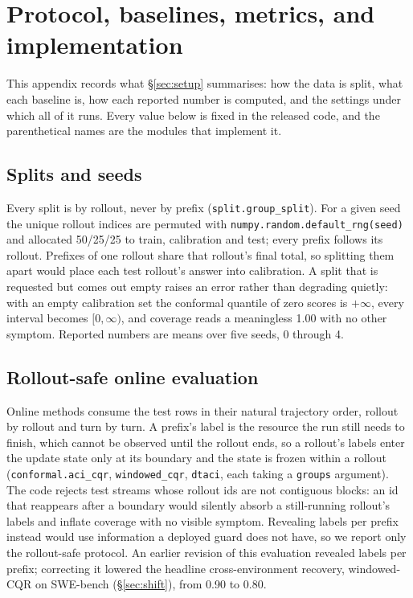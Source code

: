 \documentclass{article}
\begin{document}
\section{Protocol, baselines, metrics, and implementation}
\label{app:protocol}

This appendix records what \S\ref{sec:setup} summarises: how the data is split, what
each baseline is, how each reported number is computed, and the settings under which
all of it runs. Every value below is fixed in the released code, and the parenthetical
names are the modules that implement it.

\subsection{Splits and seeds}

Every split is by rollout, never by prefix (\texttt{split.group\_split}). For a given
seed the unique rollout indices are permuted with
\texttt{numpy.random.default\_rng(seed)} and allocated 50/25/25 to train, calibration
and test; every prefix follows its rollout. Prefixes of one rollout share that
rollout's final total, so splitting them apart would place each test rollout's answer
into calibration. A split that is requested but comes out empty raises an error rather
than degrading quietly: with an empty calibration set the conformal quantile of zero
scores is $+\infty$, every interval becomes $[0, \infty)$, and coverage reads a
meaningless 1.00 with no other symptom. Reported numbers are means over five seeds,
0 through 4.

\subsection{Rollout-safe online evaluation}

Online methods consume the test rows in their natural trajectory order, rollout by
rollout and turn by turn. A prefix's label is the resource the run still needs to
finish, which cannot be observed until the rollout ends, so a rollout's labels enter
the update state only at its boundary and the state is frozen within a rollout
(\texttt{conformal.aci\_cqr}, \texttt{windowed\_cqr}, \texttt{dtaci}, each taking a
\texttt{groups} argument). The code rejects test streams whose rollout ids are not
contiguous blocks: an id that reappears after a boundary would silently absorb a
still-running rollout's labels and inflate coverage with no visible symptom. Revealing
labels per prefix instead would use information a deployed guard does not have, so we
report only the rollout-safe protocol. An earlier revision of this evaluation revealed
labels per prefix; correcting it lowered the headline cross-environment recovery,
windowed-CQR on SWE-bench (\S\ref{sec:shift}), from 0.90 to 0.80.
\end{document}
